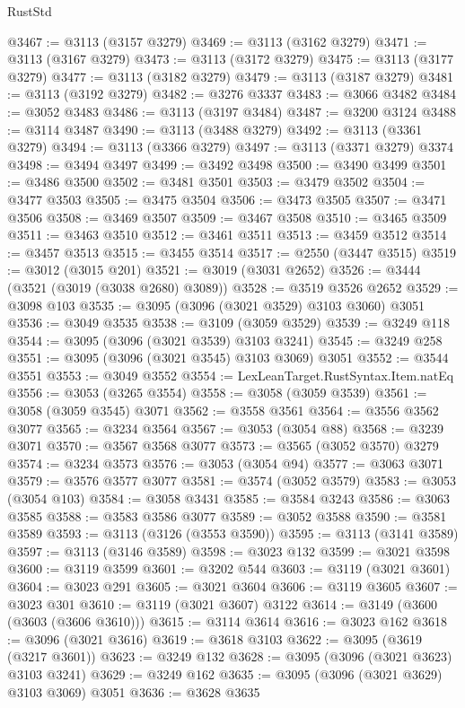 \begin{lexlean}{RustStd}
\begin{coremodule}
@3467 := @3113 (@3157 @3279)
@3469 := @3113 (@3162 @3279)
@3471 := @3113 (@3167 @3279)
@3473 := @3113 (@3172 @3279)
@3475 := @3113 (@3177 @3279)
@3477 := @3113 (@3182 @3279)
@3479 := @3113 (@3187 @3279)
@3481 := @3113 (@3192 @3279)
@3482 := @3276 @3337
@3483 := @3066 @3482
@3484 := @3052 @3483
@3486 := @3113 (@3197 @3484)
@3487 := @3200 @3124
@3488 := @3114 @3487
@3490 := @3113 (@3488 @3279)
@3492 := @3113 (@3361 @3279)
@3494 := @3113 (@3366 @3279)
@3497 := @3113 (@3371 @3279) @3374
@3498 := @3494 @3497
@3499 := @3492 @3498
@3500 := @3490 @3499
@3501 := @3486 @3500
@3502 := @3481 @3501
@3503 := @3479 @3502
@3504 := @3477 @3503
@3505 := @3475 @3504
@3506 := @3473 @3505
@3507 := @3471 @3506
@3508 := @3469 @3507
@3509 := @3467 @3508
@3510 := @3465 @3509
@3511 := @3463 @3510
@3512 := @3461 @3511
@3513 := @3459 @3512
@3514 := @3457 @3513
@3515 := @3455 @3514
@3517 := @2550 (@3447 @3515)
@3519 := @3012 (@3015 @201)
@3521 := @3019 (@3031 @2652)
@3526 := @3444 (@3521 (@3019 (@3038 @2680) @3089))
@3528 := @3519 @3526 @2652
@3529 := @3098 @103
@3535 := @3095 (@3096 (@3021 @3529) @3103 @3060) @3051
@3536 := @3049 @3535
@3538 := @3109 (@3059 @3529)
@3539 := @3249 @118
@3544 := @3095 (@3096 (@3021 @3539) @3103 @3241)
@3545 := @3249 @258
@3551 := @3095 (@3096 (@3021 @3545) @3103 @3069) @3051
@3552 := @3544 @3551
@3553 := @3049 @3552
@3554 := LexLeanTarget.RustSyntax.Item.natEq
@3556 := @3053 (@3265 @3554)
@3558 := @3058 (@3059 @3539)
@3561 := @3058 (@3059 @3545) @3071
@3562 := @3558 @3561
@3564 := @3556 @3562 @3077
@3565 := @3234 @3564
@3567 := @3053 (@3054 @88)
@3568 := @3239 @3071
@3570 := @3567 @3568 @3077
@3573 := @3565 (@3052 @3570) @3279
@3574 := @3234 @3573
@3576 := @3053 (@3054 @94)
@3577 := @3063 @3071
@3579 := @3576 @3577 @3077
@3581 := @3574 (@3052 @3579)
@3583 := @3053 (@3054 @103)
@3584 := @3058 @3431
@3585 := @3584 @3243
@3586 := @3063 @3585
@3588 := @3583 @3586 @3077
@3589 := @3052 @3588
@3590 := @3581 @3589
@3593 := @3113 (@3126 (@3553 @3590))
@3595 := @3113 (@3141 @3589)
@3597 := @3113 (@3146 @3589)
@3598 := @3023 @132
@3599 := @3021 @3598
@3600 := @3119 @3599
@3601 := @3202 @544
@3603 := @3119 (@3021 @3601)
@3604 := @3023 @291
@3605 := @3021 @3604
@3606 := @3119 @3605
@3607 := @3023 @301
@3610 := @3119 (@3021 @3607) @3122
@3614 := @3149 (@3600 (@3603 (@3606 @3610)))
@3615 := @3114 @3614
@3616 := @3023 @162
@3618 := @3096 (@3021 @3616)
@3619 := @3618 @3103
@3622 := @3095 (@3619 (@3217 @3601))
@3623 := @3249 @132
@3628 := @3095 (@3096 (@3021 @3623) @3103 @3241)
@3629 := @3249 @162
@3635 := @3095 (@3096 (@3021 @3629) @3103 @3069) @3051
@3636 := @3628 @3635

\end{coremodule}
\end{lexlean}
